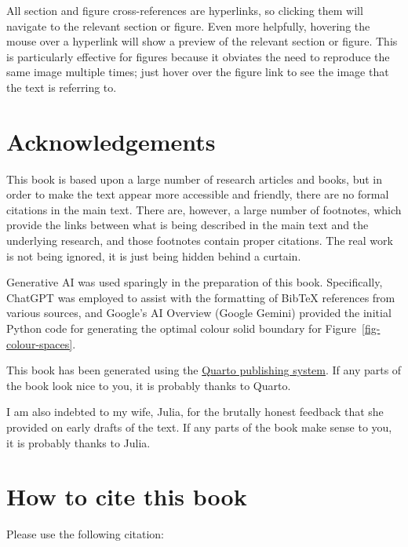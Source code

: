 \documentclass[
  letterpaper,
  DIV=11,
  numbers=noendperiod]{scrreprt}
\begin{document}
All section and figure cross-references are hyperlinks, so clicking them
will navigate to the relevant section or figure. Even more helpfully,
hovering the mouse over a hyperlink will show a preview of the relevant
section or figure. This is particularly effective for figures because it
obviates the need to reproduce the same image multiple times; just hover
over the figure link to see the image that the text is referring to.

\section*{Acknowledgements}\label{acknowledgements}


This book is based upon a large number of research articles and books,
but in order to make the text appear more accessible and friendly, there
are no formal citations in the main text. There are, however, a large
number of footnotes, which provide the links between what is being
described in the main text and the underlying research, and those
footnotes contain proper citations. The real work is not being ignored,
it is just being hidden behind a curtain.

Generative AI was used sparingly in the preparation of this book.
Specifically, ChatGPT was employed to assist with the formatting of
BibTeX references from various sources, and Google's AI Overview (Google
Gemini) provided the initial Python code for generating the optimal
colour solid boundary for Figure~\ref{fig-colour-spaces}.

This book has been generated using the \href{https://quarto.org/}{Quarto
publishing system}. If any parts of the book look nice to you, it is
probably thanks to Quarto.

I am also indebted to my wife, Julia, for the brutally honest feedback
that she provided on early drafts of the text. If any parts of the book
make sense to you, it is probably thanks to Julia.

\section*{How to cite this book}\label{how-to-cite-this-book}


Please use the following citation:
\end{document}
